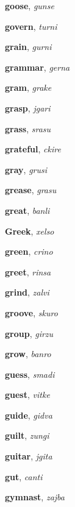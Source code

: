 \documentclass[12pt]{book}
\begin{document}
\begin{description}
\item[ ] \textbf{goose}, \textit{gunse}

\item[ ] \textbf{govern}, \textit{turni}

\item[ ] \textbf{grain}, \textit{gurni}

\item[ ] \textbf{grammar}, \textit{gerna}

\item[ ] \textbf{gram}, \textit{grake}

\item[ ] \textbf{grasp}, \textit{jgari}

\item[ ] \textbf{grass}, \textit{srasu}

\item[ ] \textbf{grateful}, \textit{ckire}

\item[ ] \textbf{gray}, \textit{grusi}

\item[ ] \textbf{grease}, \textit{grasu}

\item[ ] \textbf{great}, \textit{banli}

\item[ ] \textbf{Greek}, \textit{xelso}

\item[ ] \textbf{green}, \textit{crino}

\item[ ] \textbf{greet}, \textit{rinsa}

\item[ ] \textbf{grind}, \textit{zalvi}

\item[ ] \textbf{groove}, \textit{skuro}

\item[ ] \textbf{group}, \textit{girzu}

\item[ ] \textbf{grow}, \textit{banro}

\item[ ] \textbf{guess}, \textit{smadi}

\item[ ] \textbf{guest}, \textit{vitke}

\item[ ] \textbf{guide}, \textit{gidva}

\item[ ] \textbf{guilt}, \textit{zungi}

\item[ ] \textbf{guitar}, \textit{jgita}

\item[ ] \textbf{gut}, \textit{canti}

\item[ ] \textbf{gymnast}, \textit{zajba}



\end{description}
\end{document}
